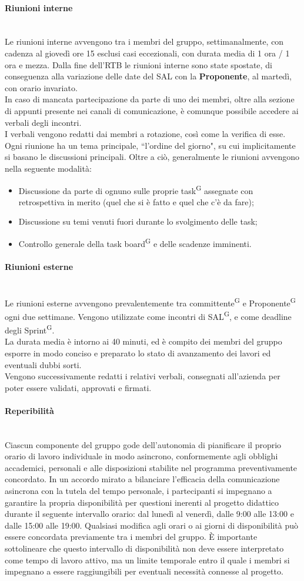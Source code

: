 \documentclass[8pt]{article}
\newcommand{\glossterm}[1]{#1\textsuperscript{G}} %
\newcommand{\subsubsubsection}[1]{\paragraph{#1}\mbox{}\\}
\begin{document}
\subsubsubsection{Riunioni interne}
Le riunioni interne avvengono tra i membri del gruppo, settimanalmente, con cadenza al giovedì ore 15 esclusi casi eccezionali, con durata media di 1 ora / 1 ora e mezza. Dalla fine dell'RTB le riunioni interne sono state spostate, di conseguenza alla variazione delle date del SAL con la \textbf{Proponente}, al martedì, con orario invariato.\\
In caso di mancata partecipazione da parte di uno dei membri, oltre alla sezione di appunti presente nei canali di comunicazione, è comunque possibile accedere ai verbali degli incontri.\\
I verbali vengono redatti dai membri a rotazione, così come la verifica di esse.\\
Ogni riunione ha un tema principale, ``l'ordine del giorno", su cui implicitamente si basano le discussioni principali.
Oltre a ciò, generalmente le riunioni avvengono nella seguente modalità:
\begin{itemize}
  \item Discussione da parte di ognuno sulle proprie \glossterm{task} assegnate con retrospettiva in merito
      (quel che si è fatto e quel che c'è da fare);
  \item Discussione su temi venuti fuori durante lo svolgimento delle task;
  \item Controllo generale della task \glossterm{board} e delle scadenze imminenti.
\end{itemize}

\subsubsubsection{Riunioni esterne}
Le riunioni esterne avvengono prevalentemente tra \glossterm{committente} e \glossterm{Proponente} ogni due
settimane. Vengono utilizzate come incontri di \glossterm{SAL}, e come deadline degli \glossterm{Sprint}.\\
La durata media è intorno ai 40 minuti, ed è compito dei membri del gruppo esporre in modo conciso e preparato lo stato di avanzamento dei lavori ed eventuali dubbi sorti.\\
Vengono successivamente redatti i relativi verbali, consegnati all'azienda per poter essere validati, approvati e firmati.

\subsubsubsection{Reperibilità}
Ciascun componente del gruppo gode dell'autonomia di pianificare il proprio orario di lavoro individuale in modo asincrono, conformemente agli obblighi accademici, personali e alle disposizioni stabilite nel programma preventivamente concordato.
In un accordo mirato a bilanciare l'efficacia della comunicazione asincrona con la tutela del tempo personale, i partecipanti si impegnano a garantire la propria disponibilità per questioni inerenti al progetto didattico durante il seguente intervallo orario: dal lunedì al venerdì, dalle 9:00 alle 13:00 e dalle 15:00 alle 19:00. Qualsiasi modifica agli orari o ai giorni di disponibilità può essere concordata previamente tra i membri del gruppo. È importante sottolineare che questo intervallo di disponibilità non deve essere interpretato come tempo di lavoro attivo, ma un limite temporale entro il quale i membri si impegnano a essere raggiungibili per eventuali necessità connesse al progetto.
\end{document}
